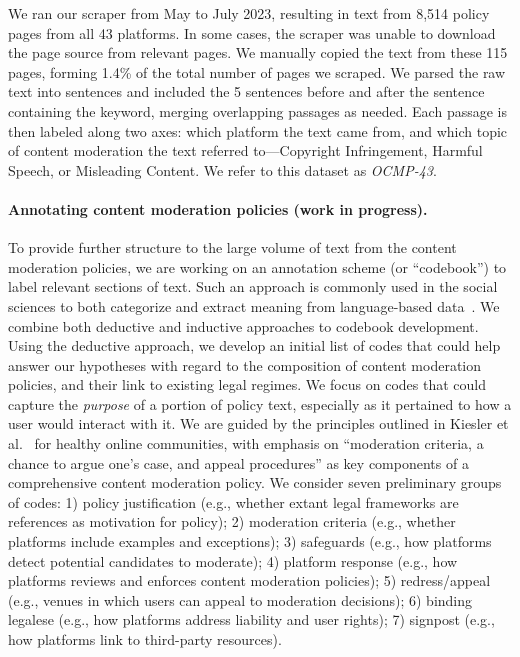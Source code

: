 We ran our scraper from May to July 2023, resulting in text from 8,514
policy pages from all 43 platforms. In some cases, 
the scraper was unable to download
the page source from relevant pages. We manually copied the text from these
115 pages, forming 1.4\% of the total number of pages we scraped. 
We parsed the raw text into sentences and included the 5 sentences before and after the sentence containing the keyword, merging overlapping passages as needed. 
Each passage is then labeled along two axes: which platform the text
came from, and which topic of content moderation the text referred
to---Copyright Infringement, Harmful Speech, or Misleading
Content.
We refer to this dataset as {\em OCMP-43}.

\paragraph{Annotating content moderation policies (work in progress).} 
To provide further structure to the large volume of text from the
content moderation policies, we are working on an
annotation scheme (or ``codebook'') to label relevant sections of text.
Such an approach is commonly used in the social sciences to both categorize
and extract meaning from language-based data~\cite{saldana2021coding}. 
We combine both deductive and inductive approaches to codebook
development. Using the deductive approach, we develop an initial list of
codes that could help answer our hypotheses with regard to the composition of
content moderation policies, and their link to existing legal regimes. We
focus on codes that could capture the \emph{purpose} of a portion of policy
text, especially as it pertained to how a user would interact with it. We are
guided by the principles outlined in Kiesler et al.~\cite{kiesler2012regulating} for healthy online communities, with
emphasis on ``moderation criteria, a chance to argue one's case, and appeal
procedures'' as key components of a comprehensive content moderation policy.
We consider seven preliminary groups of codes: 1) policy justification (e.g., whether extant legal frameworks are references as motivation for policy);
2) moderation criteria (e.g., whether platforms include examples and exceptions);
3) safeguards (e.g., how platforms detect potential candidates to moderate);
4) platform response (e.g., how platforms reviews and enforces content moderation policies);
5) redress/appeal (e.g., venues in which users can appeal to moderation decisions);
6) binding legalese (e.g., how platforms address liability and user rights);
7) signpost (e.g., how platforms link to third-party resources).


